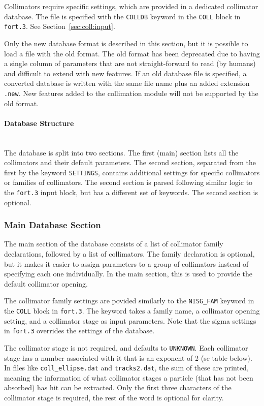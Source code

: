 Collimators require specific settings, which are provided in a dedicated collimator database.
The file is specified with the \texttt{COLLDB} keyword in the \texttt{COLL} block in \texttt{fort.3}.
See Section~\ref{sec:coll:input}.

Only the new database format is described in this section, but it is possible to load a file with the old format.
The old format has been deprecated due to having a single column of parameters that are not straight-forward to read (by humans) and difficult to extend with new features.
If an old database file is specified, a converted database is written with the same file name plus an added extension \texttt{.new}.
New features added to the collimation module will not be supported by the old format.

\paragraph{Database Structure}~\\

The database is split into two sections.
The first (main) section lists all the collimators and their default parameters.
The second section, separated from the first by the keyword \texttt{SETTINGS}, contains additional settings for specific collimators or families of collimators.
The second section is parsed following similar logic to the \texttt{fort.3} input block, but has a different set of keywords.
The second section is optional.

\subsubsection{Main Database Section}

The main section of the database consists of a list of collimator family declarations, followed by a list of collimators.
The family declaration is optional, but it makes it easier to assign parameters to a group of collimators instead of specifying each one individually.
In the main section, this is used to provide the default collimator opening.

The collimator family settings are povided similarly to the \texttt{NISG\_FAM} keyword in the \texttt{COLL} block in \texttt{fort.3}.
The keyword takes a family name, a collimator opening setting, and a collimator stage as input parameters.
Note that the sigma settings in \texttt{fort.3} overrides the settings of the database.

The collimator stage is not required, and defaults to \texttt{UNKNOWN}.
Each collimator stage has a number associated with it that is an exponent of 2 (se table below).
In files like \texttt{coll\_ellipse.dat} and \texttt{tracks2.dat}, the sum of these are printed, meaning the information of what collimator stages a particle (that has not been absorbed) has hit can be extracted.
Only the first three characters of the collimator stage is required, the rest of the word is optional for clarity.

